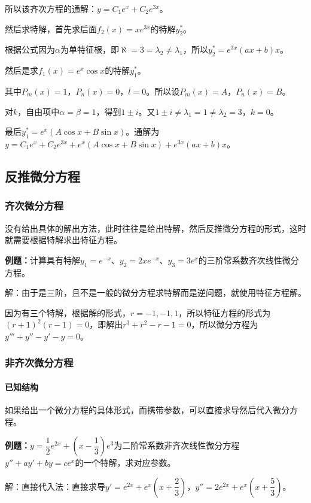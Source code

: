 所以该齐次方程的通解：$y=C_1e^x+C_2e^{3x}$。

然后求特解，首先求后面$f_2(x)=xe^{3x}$的特解$y_2^*$。

根据公式因为$\alpha$为单特征根，即$\aleph=3=\lambda_2\neq\lambda_1$，所以$y_2^*=e^{3x}(ax+b)x$。

然后是求$f_1(x)=e^x\cos x$的特解$y_1^*$。

其中$P_m(x)=1$，$P_n(x)=0$，$l=0$。所以设$P_m(x)=A$，$P_n(x)=B$。

对$k$，自由项中$\alpha=\beta=1$，得到$1\pm i$。又$1\pm i\neq\lambda_1=1\neq\lambda_2=3$，$k=0$。

最后$y_1^*=e^x(A\cos x+B\sin x)$。通解为$y=C_1e^x+C_2e^{3x}+e^x(A\cos x+B\sin x)+e^{3x}(ax+b)x$。

\subsection{反推微分方程}

\subsubsection{齐次微分方程}

没有给出具体的解出方法，此时往往是给出特解，然后反推微分方程的形式，这时就需要根据特解求出特征方程。

\textbf{例题：}计算具有特解$y_1=e^{-x}$、$y_2=2xe^{-x}$、$y_3=3e^x$的三阶常系数齐次线性微分方程。

解：由于是三阶，且不是一般的微分方程求特解而是逆问题，就使用特征方程解。

因为有三个特解，根据解的形式，$r=-1,-1,1$，所以特征方程的形式为$(r+1)^2(r-1)=0$，即解出$r^3+r^2-r-1=0$，所以微分方程为$y'''+y''-y'-y=0$。

\subsubsection{非齐次微分方程}

\paragraph{已知结构} \leavevmode \medskip

如果给出一个微分方程的具体形式，而携带参数，可以直接求导然后代入微分方程。

\textbf{例题：}$y=\dfrac{1}{2}e^{2x}+(x-\dfrac{1}{3})e^3$为二阶常系数非齐次线性微分方程$y''+ay'+by=ce^x$的一个特解，求对应参数。

解：直接代入法：直接求导$y'=e^{2x}+e^x(x+\dfrac{2}{3})$，$y''=2e^{2x}+e^x(x+\dfrac{5}{3})$。

